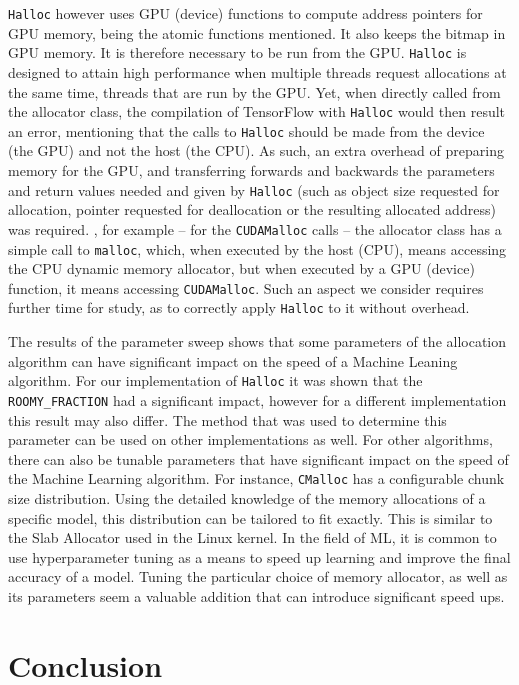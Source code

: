\documentclass[12pt,twoside]{article}
\begin{document}
\texttt{Halloc} however uses GPU (device) functions to compute address pointers for GPU memory, being the atomic functions mentioned. It also keeps the bitmap in GPU memory. It is therefore necessary to be run from the GPU. \texttt{Halloc} is designed to attain high performance when multiple threads request allocations at the same time, threads that are run by the GPU. Yet, when directly called from the allocator class, the compilation of TensorFlow with \texttt{Halloc} would then result an error, mentioning that the calls to \texttt{Halloc} should be made from the device (the GPU) and not the host (the CPU). As such, an extra overhead of preparing memory for the GPU, and transferring forwards and backwards the parameters and return values needed and given by \texttt{Halloc} (such as object size requested for allocation, pointer requested for deallocation or the resulting allocated address) was required. , for example -- for the \texttt{CUDAMalloc} calls -- the allocator class has a simple call to \texttt{malloc}, which, when executed by the host (CPU), means accessing the CPU dynamic memory allocator, but when executed by a GPU (device) function, it means accessing \texttt{CUDAMalloc}. Such an aspect we consider requires further time for study, as to correctly apply \texttt{Halloc} to it without overhead.

The results of the parameter sweep shows that some parameters of the allocation algorithm can have significant impact on the speed of a Machine Leaning algorithm. For our implementation of \texttt{Halloc} it was shown that the \texttt{ROOMY\_FRACTION} had a significant impact, however for a different implementation this result may also differ. The method that was used to determine this parameter can be used on other implementations as well. For other algorithms, there can also be tunable parameters that have significant impact on the speed of the Machine Learning algorithm. For instance, \texttt{CMalloc} has a configurable chunk size distribution. Using the detailed knowledge of the memory allocations of a specific model, this distribution can be tailored to fit exactly. This is similar to the Slab Allocator used in the Linux kernel\cite{BARRY2012227}. In the field of ML, it is common to use hyperparameter tuning as a means to speed up learning and improve the final accuracy of a model\cite{LEE2018359}. Tuning the particular choice of memory allocator, as well as its parameters seem a valuable addition that can introduce significant speed ups.

\section{Conclusion}
\label{sec:conclusion}
\end{document}
